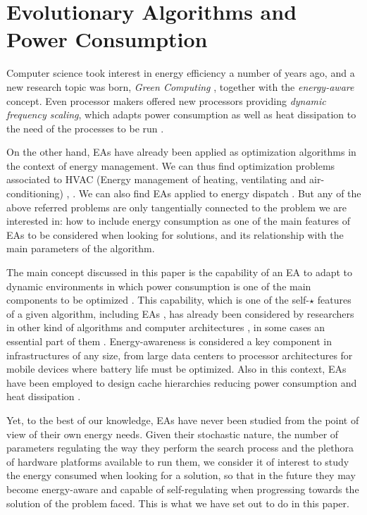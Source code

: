 \section{Evolutionary Algorithms and Power Consumption}
\label{eas}

Computer science took interest in energy efficiency a number of years
ago, and a new research topic was born, \textit{Green Computing}
\cite{hooper2008}, together with the \textit{energy-aware}
\cite{barroso2007,energy-aware} concept. Even processor 
makers offered new processors providing \textit{dynamic frequency
  scaling}, which adapts power consumption as well as heat dissipation
to the need of the processes to be run \cite{Bansal2004,albers2011,energy-efficient}. 


On the other hand, EAs have already been applied as optimization
algorithms in the context of energy management.  We can thus find
optimization problems associated to HVAC (Energy management of
heating, ventilating and air-conditioning) \cite{Fong2006},
\cite{Lee2011}.  We can also find EAs applied to energy dispatch
\cite{Fadaee2012}.  But any of the above referred problems are only
tangentially connected to the problem we are interested in:  how to
include energy consumption as one of the main features of EAs to be
considered when looking for solutions, and its relationship with the
main parameters of the algorithm. 

The main concept discussed in this paper is the capability of an EA to adapt
to dynamic environments in which power consumption is one of the main
components to be optimized \cite{ephemeral2015}. This capability, which
is one of the self-$\star$ features of a
given algorithm, including EAs \cite{ephemeral2015}, has already been
considered by researchers in other kind of algorithms and computer architectures \cite{Almeida2013}, in some cases
an essential part of them \cite{energy-aware}. Energy-awareness is
considered a key
component in infrastructures of any size, from large data centers to
processor architectures for mobile devices where battery life must be
optimized.  Also in this context, EAs have been employed to design
cache hierarchies reducing power consumption and heat dissipation
\cite{DiazAlvarez2016}. 

Yet, to the best of our knowledge, EAs have never been studied from
the point of view of their own energy needs. 
Given their stochastic nature, the number of parameters regulating the
way they perform the search process and the plethora of hardware
platforms available to run them, we consider it of interest to study
the energy consumed when looking for a solution, so that in the future
they may become energy-aware and capable of self-regulating when
progressing towards the solution of the problem faced. This is what we
have set out to do in this paper.

